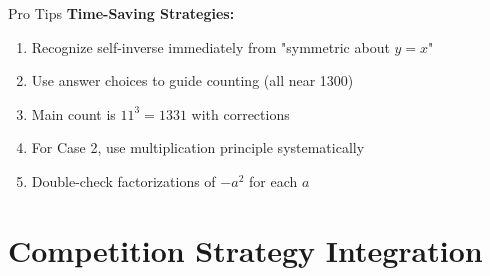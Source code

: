 \documentclass[12pt]{article}
\begin{document}
\begin{protipbox}{Pro Tips}
\textbf{Time-Saving Strategies:}
\begin{enumerate}
    \item Recognize self-inverse immediately from "symmetric about $y=x$"
    \item Use answer choices to guide counting (all near 1300)
    \item Main count is $11^3 = 1331$ with corrections
    \item For Case 2, use multiplication principle systematically
    \item Double-check factorizations of $-a^2$ for each $a$
\end{enumerate}
\end{protipbox}

\section{Competition Strategy Integration}
\end{document}
